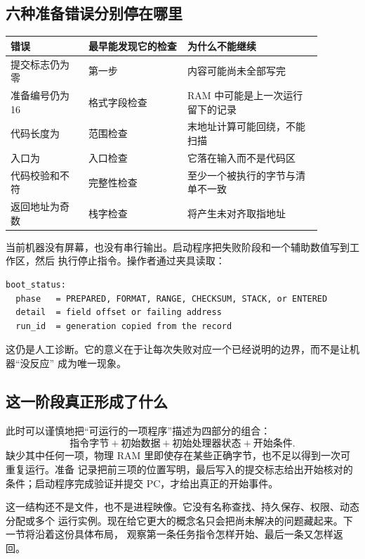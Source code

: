 \subsection{六种准备错误分别停在哪里}

\begin{longtable}{|L{0.22\linewidth}|L{0.28\linewidth}|L{0.38\linewidth}|}
\hline
{}
错误 & 最早能发现它的检查 & 为什么不能继续 \\ \hline
提交标志仍为零 & 第一步 & 内容可能尚未全部写完 \\ \hline
准备编号仍为 16 & 格式字段检查 & RAM 中可能是上一次运行留下的记录 \\ \hline
代码长度为  & 范围检查 & 末地址计算可能回绕，不能扫描 \\ \hline
入口为  & 入口检查 & 它落在输入而不是代码区 \\ \hline
代码校验和不符 & 完整性检查 & 至少一个被执行的字节与清单不一致 \\ \hline
返回地址为奇数 & 栈字检查 &  将产生未对齐取指地址 \\ \hline
\end{longtable}

当前机器没有屏幕，也没有串行输出。启动程序把失败阶段和一个辅助数值写到工作区，然后
执行停止指令。操作者通过夹具读取：

\begin{lstlisting}
boot_status:
  phase   = PREPARED, FORMAT, RANGE, CHECKSUM, STACK, or ENTERED
  detail  = field offset or failing address
  run_id  = generation copied from the record
\end{lstlisting}

这仍是人工诊断。它的意义在于让每次失败对应一个已经说明的边界，而不是让机器“没反应”
成为唯一现象。

\subsection{这一阶段真正形成了什么}

此时可以谨慎地把“可运行的一项程序”描述为四部分的组合：
\[
\text{指令字节}+\text{初始数据}+\text{初始处理器状态}+\text{开始条件}.
\]
缺少其中任何一项，物理 RAM 里即使存在某些正确字节，也不足以得到一次可重复运行。准备
记录把前三项的位置写明，最后写入的提交标志给出开始核对的条件；启动程序完成验证并提交
PC，才给出真正的开始事件。

这一结构还不是文件，也不是进程映像。它没有名称查找、持久保存、权限、动态分配或多个
运行实例。现在给它更大的概念名只会把尚未解决的问题藏起来。下一节将沿着这份具体布局，
观察第一条任务指令怎样开始、最后一条又怎样返回。
